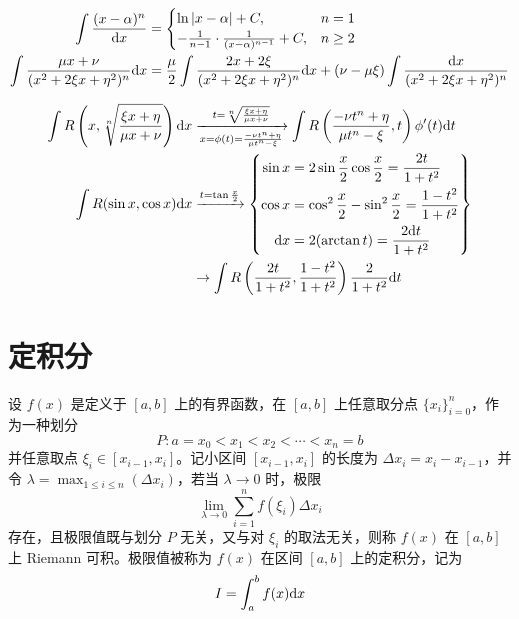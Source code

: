 \documentclass{ctexbook}
\def\diff{\textnormal{d}}
\begin{document}
\begin{proposition}[有理函数不定积分]
    \begin{align}
        \int\frac{(x-\alpha)^n}{\diff x}&=\begin{cases}
            \ln|x-\alpha|+C, &n=1\\
            -\frac{1}{n-1}\cdot\frac{1}{(x-\alpha)^{n-1}}+C,&n\geq 2
        \end{cases}\\
        \int\frac{\mu x+\nu}{(x^2+2\xi x+\eta^2)^n}\diff x &=\frac{\mu}{2}\int\frac{2x+2\xi}{(x^2+2\xi x+\eta^2)^n}\diff x+(\nu-\mu\xi)\int\frac{\diff x}{(x^2+2\xi x+\eta^2)^n}
    \end{align}
\end{proposition}

\begin{proposition}[可化为有理函数不定积分]
    \begin{align}
        \int R\left(x,\sqrt[n]{\frac{\xi x+\eta}{\mu x+\nu}}\right)\diff x&\xrightarrow[x=\phi(t)=\frac{-\nu t^n+\eta}{\mu t^n-\xi}]{t=\sqrt[n]{\frac{\xi x+\eta}{\mu x+\nu}}} \int R\left(\frac{-\nu t^n+\eta}{\mu t^n-\xi},t\right)\phi^\prime (t)\diff t\\
        \int R(\sin x,\cos x)\diff x&\xrightarrow{t=\tan\frac{x}{2}}\left\{\begin{aligned}
            \sin x&=2\sin\frac{x}{2}\cos\frac{x}{2}=\frac{2t}{1+t^2}\\
            \cos x&=\cos^2\frac{x}{2}-\sin^2\frac{x}{2}=\frac{1-t^2}{1+t^2}\\
            \diff x&=2(\arctan t)=\frac{2\diff t}{1+t^2}
        \end{aligned}
        \right\}\\
        &\rightarrow \int R\left(\frac{2t}{1+t^2},\frac{1-t^2}{1+t^2}\right)\frac{2}{1+t^2}\diff t
    \end{align}
\end{proposition}

\section{定积分}

\begin{definition}[定积分]
    设 $f(x)$ 是定义于 $[a,b]$ 上的有界函数，在 $[a,b]$ 上任意取分点 $\{x_i\}_{i=0}^n$，作为一种划分
    \begin{equation}
        P:a=x_0<x_1<x_2<\cdots<x_n=b
    \end{equation}
    并任意取点 $\xi_i\in[x_{i-1},x_i]$。记小区间 $[x_{i-1},x_i]$ 的长度为 $\Delta x_i=x_i-x_{i-1}$，并令 $\lambda=\max_{1\leq i\leq n}(\Delta x_i)$，若当 $\lambda\rightarrow 0$ 时，极限
    \begin{equation}
        \lim_{\lambda\rightarrow 0}\sum_{i=1}^n f(\xi_i)\Delta x_i
    \end{equation}
    存在，且极限值既与划分 $P$ 无关，又与对 $\xi_i$ 的取法无关，则称 $f(x)$ 在 $[a,b]$ 上 Riemann 可积。极限值被称为 $f(x)$ 在区间 $[a,b]$ 上的定积分，记为
    \begin{equation}
        I=\int_a^b f(x)\diff x
    \end{equation}
\end{definition}
\end{document}

